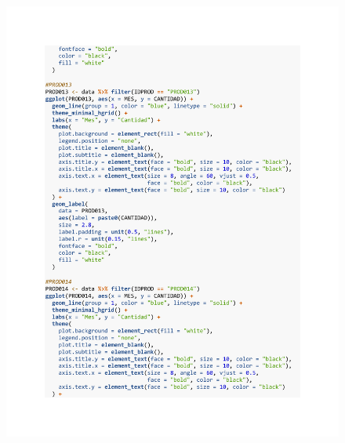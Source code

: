 \begin{figure}[h!]
        \begin{tcolorbox}[colback=white, colframe=black, boxrule=1.5pt, sharp corners=all]
            {\includegraphics[width=\linewidth, height=22cm, trim=2.5cm 2.5cm 2.5cm 2.5cm, clip]{images/script13.pdf}}
        \end{tcolorbox}
\end{figure}

